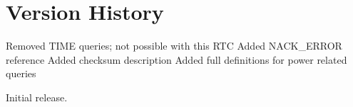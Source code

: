 \documentclass{article}
\begin{document}
\section{Version History}


Removed TIME queries; not possible with this RTC
Added NACK\_ERROR reference
Added checksum description
Added full definitions for power related queries


Initial release.

    
\end{document}
